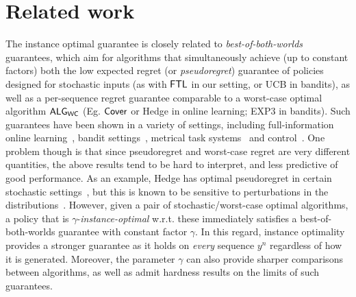 \section{Related work} \label{sec:relatedwork}

The instance optimal guarantee is closely related to \emph{best-of-both-worlds} guarantees, which aim for algorithms that simultaneously achieve (up to constant factors) both the low expected regret (or \emph{pseudoregret}) guarantee of policies designed for stochastic inputs (as with $\mathsf{FTL}$ in our setting, or UCB in bandits), as well as a per-sequence regret guarantee comparable to a worst-case optimal algorithm $\mathsf{ALG}_{\mathsf{WC}}$ (Eg. $\mathsf{Cover}$ or Hedge in online learning; EXP$3$ in bandits). 
Such guarantees have been shown in a variety of settings, including full-information online learning~\citep{de2014follow,Orabona--Pal2015,mourtada2019optimality,bilodeau2023relaxing}, bandit settings~\citep{bubeck2012best,Zimmert--Seldin2019,Lykouris--Mirrokni--PaesLeme2018,Dann--Wei--Zimmert2023}, metrical task systems~\citep{bhuyan2023best} and control~\citep{sabag2021regret, goel2023best}.
One problem though is that since pseudoregret and worst-case regret are very different quantities, the above results tend to be hard to interpret, and less predictive of good performance. As an example, Hedge has optimal pseudoregret in certain stochastic settings~\citep{mourtada2019optimality}, but this is known to be sensitive to perturbations in the distributions~\citep{bilodeau2023relaxing}.
However, given a pair of stochastic/worst-case optimal algorithms, a policy that is $\gamma$-\emph{instance-optimal} w.r.t. these immediately satisfies a {best-of-both-worlds} guarantee with constant factor $\gamma$. 
In this regard, instance optimality provides a stronger guarantee as it holds on \emph{every} sequence $y^n$ regardless of how it is generated. 
Moreover, the parameter $\gamma$ can also provide sharper comparisons between algorithms, as well as admit hardness results on the limits of such guarantees.


